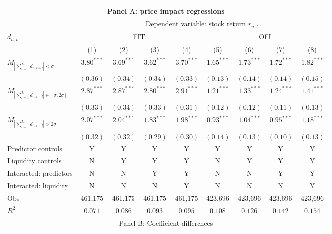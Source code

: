 \begin{tabular}{lcccccccc}
  \hline \multicolumn{9}{c}{Panel A: price impact regressions} \\
 \hline
    & \multicolumn{8}{c}{Dependent variable: stock return $r_{n,t}$} \\

    \cmidrule(l){2-9} $d_{n,t} = $ & \multicolumn{4}{c}{FIT} & \multicolumn{4}{c}{OFI} \\
 \cmidrule(l){2-5} \cmidrule(l){6-9} 
  \cmidrule(l){2-5} \cmidrule(l){6-9} \vspace{5pt} & (1) & (2) & (3) & (4) & (5) & (6) & (7) & (8) \\ 
  $M_{\left|\sum_{l=1}^L d_{n,t-l}\right| < \sigma}$ & $3.80^{***}$ & $3.69^{***}$ & $3.62^{***}$ & $3.70^{***}$ & $1.65^{***}$ & $1.73^{***}$ & $1.72^{***}$ & $1.82^{***}$ \\ 
   & $(0.36)$ & $(0.34)$ & $(0.34)$ & $(0.33)$ & $(0.13)$ & $(0.14)$ & $(0.14)$ & $(0.15)$ \\ 
  $M_{\left|\sum_{l=1}^L d_{n,t-l}\right| \in [\sigma, 2\sigma]}$ & $2.87^{***}$ & $2.87^{***}$ & $2.80^{***}$ & $2.91^{***}$ & $1.21^{***}$ & $1.33^{***}$ & $1.24^{***}$ & $1.41^{***}$ \\ 
   & $(0.33)$ & $(0.34)$ & $(0.33)$ & $(0.31)$ & $(0.12)$ & $(0.12)$ & $(0.11)$ & $(0.13)$ \\ 
  $M_{\left|\sum_{l=1}^L d_{n,t-l}\right| > 2 \sigma}$ & $2.07^{***}$ & $2.04^{***}$ & $1.83^{***}$ & $1.98^{***}$ & $0.93^{***}$ & $1.04^{***}$ & $0.95^{***}$ & $1.18^{***}$ \\ 
   \vspace{5pt} & $(0.32)$ & $(0.32)$ & $(0.29)$ & $(0.30)$ & $(0.14)$ & $(0.13)$ & $(0.10)$ & $(0.13)$ \\ 
  Predictor controls & Y & Y & Y & Y & Y & Y & Y & Y \\ 
  Liquidity controls & N & Y & Y & Y & N & Y & Y & Y \\ 
  Interacted: predictors & N & N & Y & Y & N & N & Y & Y \\ 
   \vspace{5pt}Interacted: liquidity & N & N & N & Y & N & N & N & Y \\ 
  Obs & 461,175 & 461,175 & 461,175 & 461,175 & 423,696 & 423,696 & 423,696 & 423,696 \\ 
  $R^2$ & $0.071$ & $0.086$ & $0.093$ & $0.095$ & $0.108$ & $0.126$ & $0.142$ & $0.154$ \\ 
   \hline \multicolumn{9}{c}{Panel B: Coefficient differences} \\

\end{tabular}
